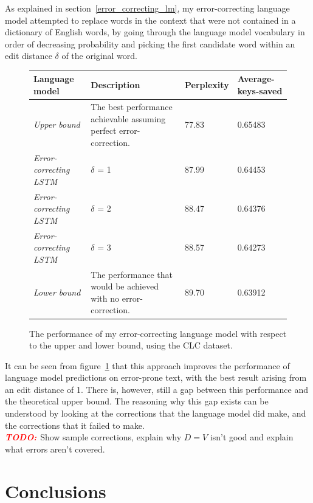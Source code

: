 \documentclass[a4paper, 12pt]{report}
\newcommand{\todo}{\textbf{\textit{\textcolor{red}{TODO: }}}}
\newcommand{\tbf}[1]{\textbf{#1}}
\newcommand{\tit}[1]{\textit{#1}}
\begin{document}
As explained in section~\ref{error_correcting_lm}, my error-correcting language model attempted to replace words in the context that were not contained in a dictionary of English words, by going through the language model vocabulary in order of decreasing probability and picking the first candidate word within an edit distance $\delta$ of the original word. \\

\begin{figure}[h]
\captionsetup{justification=centering}
\begin{adjustbox}{center}
\begin{tabular}{| L{3.5cm} | L{8cm} | C{2.2cm} | C{2cm} |}
	\hline
	\tbf{Language model} & \tbf{Description} & \tbf{Perplexity} & \tbf{Average-keys-saved} \\ \hline
	\tit{Upper bound} & The best performance achievable assuming perfect error-correction. & 77.83 & 0.65483 \\ \hline
	\tit{Error-correcting LSTM} & $\delta$ = 1 & 87.99 & 0.64453 \\ \hline
	\tit{Error-correcting LSTM} & $\delta$ = 2 & 88.47 & 0.64376 \\ \hline
	\tit{Error-correcting LSTM} & $\delta$ = 3 & 88.57 & 0.64273 \\ \hline
	\tit{Lower bound} & The performance that would be achieved with no error-correction. & 89.70 & 0.63912 \\ \hline
\end{tabular}
\end{adjustbox}
\caption{The performance of my error-correcting language model with respect to the upper and lower bound, using the CLC dataset.}
\label{fig:error_correcting_results}
\end{figure}

It can be seen from figure~\ref{fig:error_correcting_results} that this approach improves the performance of language model predictions on error-prone text, with the best result arising from an edit distance of 1. There is, however, still a gap between this performance and the theoretical upper bound. The reasoning why this gap exists can be understood by looking at the corrections that the language model did make, and the corrections that it failed to make. \\

\todo{Show sample corrections, explain why $D=V$ isn't good and explain what errors aren't covered.}

\chapter{Conclusions}
\end{document}
